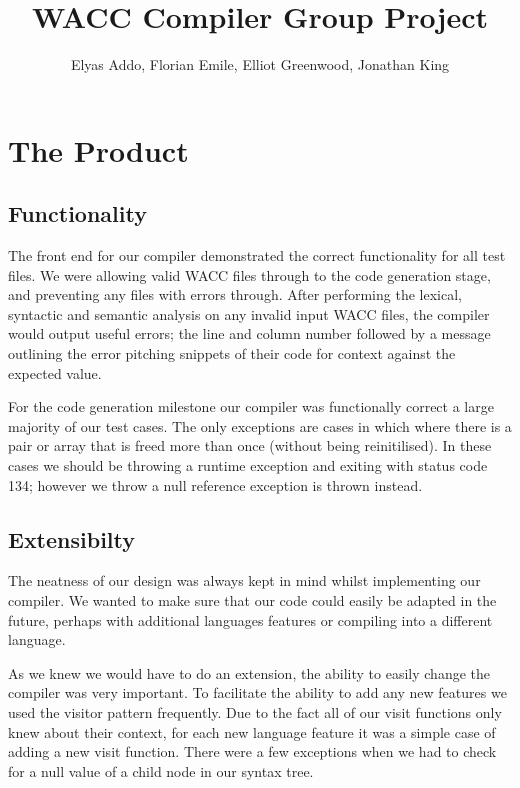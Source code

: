 \documentclass[11pt,a4paper]{article}
\begin{document}
\title{WACC Compiler Group Project}
\author{Elyas Addo, Florian Emile, Elliot Greenwood, Jonathan King}

\maketitle

\section{The Product}
\label{sec:The Product}

\subsection{Functionality}
\label{sub:Functionality}

The front end for our compiler demonstrated the correct functionality for all test files. We were allowing valid WACC files through to the code generation stage, and preventing any files with errors through. After performing the lexical, syntactic and semantic analysis on any invalid input WACC files, the compiler would output useful errors; the line and column number followed by a message outlining the error pitching snippets of their code for context against the expected value.

For the code generation milestone our compiler was functionally correct a large majority of our test cases. The only exceptions are cases in which where there is a pair or array that is freed more than once (without being reinitilised). In these cases we should be throwing a runtime exception and exiting with status code 134; however we throw a null reference exception is thrown instead.

\subsection{Extensibilty}
\label{subs:Extensibilty}

The neatness of our design was always kept in mind whilst implementing our compiler. We wanted to make sure that our code could easily be adapted in the future, perhaps with additional languages features or compiling into a different language.

As we knew we would have to do an extension, the ability to easily change the compiler was very important. To facilitate the ability to add any new features we used the visitor pattern frequently. Due to the fact all of our visit functions only knew about their context, for each new language feature it was a simple case of adding a new visit function. There were a few exceptions when we had to check for a null value of a child node in our syntax tree.
\end{document}
